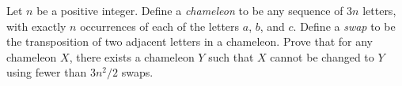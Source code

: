 Let $n$ be a positive integer. Define a \emph{chameleon} to be any sequence of $3n$ letters, with exactly $n$ occurrences of each of the letters $a$, $b$, and $c$. Define a \emph{swap} to be the transposition of two adjacent letters in a chameleon. Prove that for any chameleon $X$, there exists a chameleon $Y$ such that $X$ cannot be changed to $Y$ using fewer than $3n^2/2$ swaps.
